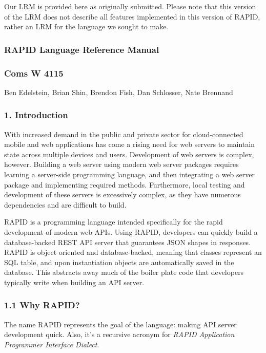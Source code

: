 

Our LRM is provided here as originally submitted.  Please note that this
version of the LRM does not describe all features implemented in this version
of RAPID, rather an LRM for the language we sought to make.

\subsubsection*{RAPID Language Reference
Manual}\label{rapid-language-reference-manual}

\subsubsection*{Coms W 4115}\label{coms-w-4115}

Ben Edelstein, Brian Shin, Brendon Fish, Dan Schlosser, Nate Brennand

\subsubsection*{1. Introduction}\label{introduction}

With increased demand in the public and private sector for
cloud-connected mobile and web applications has come a rising need for
web servers to maintain state across multiple devices and users.
Development of web servers is complex, however. Building a web server
using modern web server packages requires learning a server-side
programming language, and then integrating a web server package and
implementing required methods. Furthermore, local testing and
development of these servers is excessively complex, as they have
numerous dependencies and are difficult to build.

RAPID is a programming language intended specifically for the rapid
development of modern web APIs. Using RAPID, developers can quickly
build a database-backed REST API server that guarantees JSON shapes in
responses. RAPID is object oriented and database-backed, meaning that
classes represent an SQL table, and upon instantiation objects are
automatically saved in the database. This abstracts away much of the
boiler plate code that developers typically write when building an API
server.

\subsubsection*{1.1 Why RAPID?}\label{why-rapid}

The name RAPID represents the goal of the language: making API server
development quick. Also, it's a recursive acronym for \emph{RAPID
Application Programmer Interface Dialect}.


